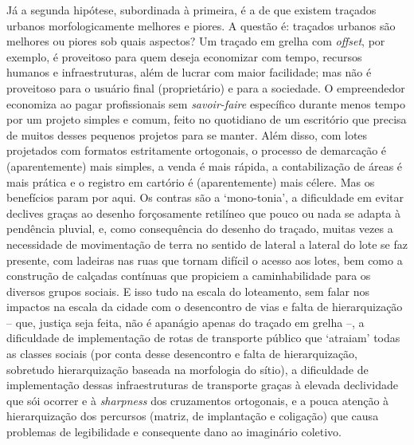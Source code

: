 \documentclass[twoside, 12pt, english,italian,latin,greek,french,spanish,brazil]{book}
\begin{document}
        Já a segunda hipótese, subordinada à primeira, é a de que existem traçados urbanos morfologicamente melhores e piores. A questão é: traçados urbanos são melhores ou piores sob quais aspectos? Um traçado em grelha com \textit{offset}, por exemplo, é proveitoso para quem deseja economizar com tempo, recursos humanos e infraestruturas, além de lucrar com maior facilidade; mas não é proveitoso para o usuário final (proprietário) e para a sociedade. O empreendedor economiza ao pagar profissionais sem \textit{savoir-faire} específico durante menos tempo por um projeto simples e comum, feito no quotidiano de um escritório que precisa de muitos desses pequenos projetos para se manter. Além disso, com lotes projetados com formatos estritamente ortogonais, o processo de demarcação é (aparentemente) mais simples, a venda é mais rápida, a contabilização de áreas é mais prática e o registro em cartório é (aparentemente) mais célere. Mas os benefícios param por aqui. Os contras são a ‘mono-tonia’, a dificuldade em evitar declives graças ao desenho forçosamente retilíneo que pouco ou nada se adapta à pendência pluvial, e, como consequência do desenho do traçado, muitas vezes a necessidade de movimentação de terra no sentido de lateral a lateral do lote se faz presente, com ladeiras nas ruas que tornam difícil o acesso aos lotes, bem como a construção de calçadas contínuas que propiciem a caminhabilidade para os diversos grupos sociais. E isso tudo na escala do loteamento, sem falar nos impactos na escala da cidade com o desencontro de vias e falta de hierarquização – que, justiça seja feita, não é apanágio apenas do traçado em grelha –, a dificuldade de implementação de rotas de transporte público que ‘atraiam’ todas as classes sociais (por conta desse desencontro e falta de hierarquização, sobretudo hierarquização baseada na morfologia do sítio), a dificuldade de implementação dessas infraestruturas de transporte graças à elevada declividade que sói ocorrer e à \textit{sharpness} dos cruzamentos ortogonais, e a pouca atenção à hierarquização dos percursos (matriz, de implantação e coligação) que causa problemas de legibilidade e consequente dano ao imaginário coletivo.
\end{document}
